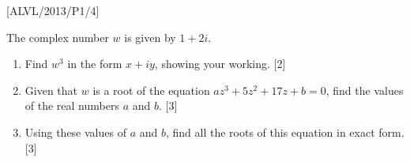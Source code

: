 \item {[}ALVL/2013/P1/4{]}

The complex number $w$ is given by $1+2i$. 
\begin{enumerate}
\item Find $w^{3}$ in the form $x+iy$, showing your working. \hfill{}
{[}2{]}
\item Given that $w$ is a root of the equation $az^{3}+5z^{2}+17z+b=0$,
find the values of the real numbers $a$ and $b$. \hfill{} {[}3{]}
\item Using these values of $a$ and $b$, find all the roots of this equation
in exact form. \hfill{} {[}3{]}
\end{enumerate}
